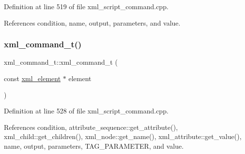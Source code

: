 Definition at line 519 of file xml\+\_\+script\+\_\+command.\+cpp.



References condition, name, output, parameters, and value.

\mbox{\label{classxml__command__t_a9c8e18a3d1c0a2cd274c2a0d2ba6cab5}} 
\subsubsection{\texorpdfstring{xml\+\_\+command\+\_\+t()}{xml\_command\_t()}\hspace{0.1cm}{\footnotesize\ttfamily [2/2]}}
{\footnotesize\ttfamily xml\+\_\+command\+\_\+t\+::xml\+\_\+command\+\_\+t (\begin{DoxyParamCaption}\item[{const \hyperlink{classxml__element}{xml\+\_\+element} $\ast$}]{element }\end{DoxyParamCaption})\hspace{0.3cm}{\ttfamily [explicit]}}



Definition at line 528 of file xml\+\_\+script\+\_\+command.\+cpp.



References condition, attribute\+\_\+sequence\+::get\+\_\+attribute(), xml\+\_\+child\+::get\+\_\+children(), xml\+\_\+node\+::get\+\_\+name(), xml\+\_\+attribute\+::get\+\_\+value(), name, output, parameters, T\+A\+G\+\_\+\+P\+A\+R\+A\+M\+E\+T\+ER, and value.

